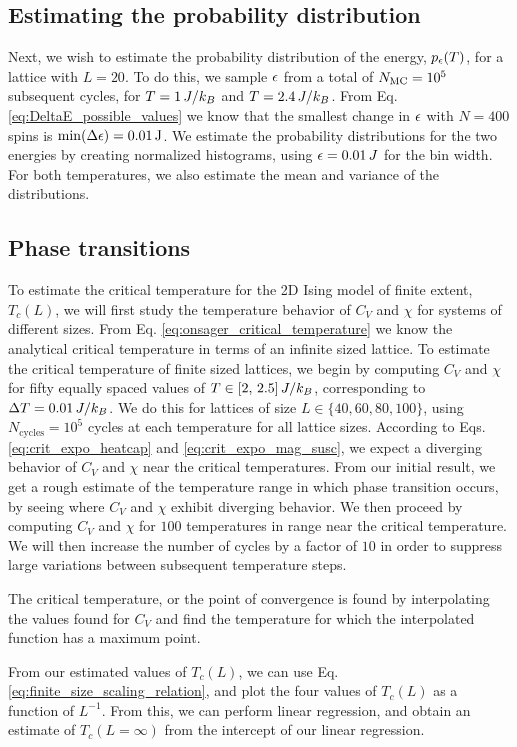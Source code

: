 \subsection{Estimating the probability distribution}\label{subsec_methods:histogram}
Next, we wish to estimate the probability distribution of the energy, $p_\epsilon(T)$, for a lattice with $L=20$. To do this, we sample $\epsilon$ from a total of $N_\mathrm{MC}=10^5$ subsequent cycles, for $T=1\,J/k_B$ and $T=2.4\,J/k_B$. From Eq. \eqref{eq:DeltaE_possible_values} we know that the smallest change in $\epsilon$ with $N=400$ spins is $\min(\Delta\epsilon)=0.01\,\mathrm{J}$. We estimate the probability distributions for the two energies by creating normalized histograms, using $\epsilon=0.01\,J$ for the bin width. For both temperatures, we also estimate the mean and variance of the distributions.  


\subsection{Phase transitions}\label{subsec_methods:PT}
To estimate the critical temperature for the 2D Ising model of finite extent, $T_c(L)$, we will first study the temperature behavior of $C_V$ and $\chi$ for systems of different sizes. From Eq. \eqref{eq:onsager_critical_temperature} we know the analytical critical temperature in terms of an infinite sized lattice. To estimate the critical temperature of finite sized lattices, we begin by computing $C_V$ and $\chi$ for fifty equally spaced values of $T\in[2,\,2.5]\,J/k_B$, corresponding to $\Delta T = 0.01\,J/k_B$. We do this for lattices of size $L\in\{40,60,80,100\}$, using $N_\mathrm{cycles}=10^5$ cycles at each temperature for all lattice sizes. According to Eqs. \eqref{eq:crit_expo_heatcap} and \eqref{eq:crit_expo_mag_susc}, we expect a diverging behavior of $C_V$ and $\chi$ near the critical temperatures. From our initial result, we get a rough estimate of the temperature range in which phase transition occurs, by seeing where $C_V$ and $\chi$ exhibit diverging behavior. We then proceed by computing $C_V$ and $\chi$ for $100$ temperatures in range near the critical temperature. We will then increase the number of cycles by a factor of $10$ in order to suppress large variations between subsequent temperature steps. 

The critical temperature, or the point of convergence is found by interpolating the values found for $C_V$ and find the temperature for which the interpolated function has a maximum point.

From our estimated values of $T_c(L)$, we can use Eq. \eqref{eq:finite_size_scaling_relation}, and plot the four values of $T_c(L)$ as a function of $L^{-1}$. From this, we can perform linear regression, and obtain an estimate of $T_c(L=\infty)$ from the intercept of our linear regression. 

